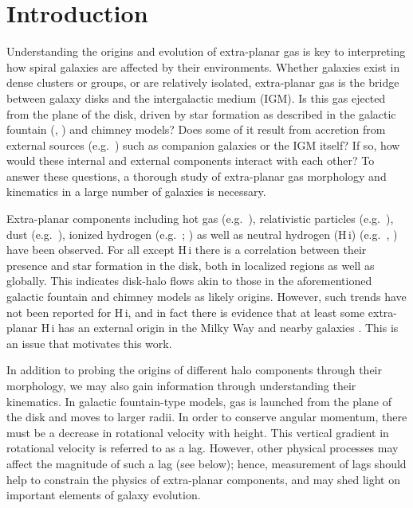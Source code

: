 \documentclass{emulateapj}
\begin{document}

\section{Introduction} \label{Section1}


\par
     Understanding the origins and evolution of extra-planar gas is key to interpreting how spiral galaxies are affected by their environments.  Whether galaxies exist in dense clusters or groups, or are relatively isolated, extra-planar gas is the bridge between galaxy disks and the intergalactic medium (IGM).  Is this gas ejected from the plane of the disk, driven by star formation as described in the galactic fountain (\citealt{1976ApJ...205..762S}, \citealt{1980ApJ...236..577B}) and chimney \citep{1989ApJ...345..372N} models?  Does some of it result from accretion from external sources (e.g.\ \citealt{2009ApJ...700L...1K}) such as companion galaxies or the IGM itself?  If so, how would these internal and external components interact with each other?  To answer these questions, a thorough study of extra-planar gas morphology and kinematics in a large number of galaxies is necessary.

\par
     Extra-planar components including hot gas (e.g.\ \citealt{2006A&A...448...43T}), relativistic particles (e.g.\ \citealt{1999AJ....117.2102I}), dust (e.g.\ \citealt{1999AJ....117.2077H}), ionized hydrogen (e.g.\ \citealt{1996ApJ...462..712R}; \citealt{2003A&A...406..493R}) as well as neutral hydrogen ({\sc H\,i}) (e.g.\ \citealt{1997ApJ...491..140S}, \citealt{2007AJ....134.1019O}) have been observed.   For all except {\sc H\,i} there is a correlation between their presence and star formation in the disk, both in localized regions as well as globally.  This indicates disk-halo flows akin to those in the aforementioned galactic fountain and chimney models as likely origins.  However, such trends have not been reported for {\sc H\,i}, and in fact there is evidence that at least some extra-planar {\sc H\,i} has an external origin in the Milky Way \citep{1997ARA&A..35..217W} and nearby galaxies \citep{2008A&ARv..15..189S}.  This is an issue that motivates this work.

\par
     In addition to probing the origins of different halo components through their morphology, we may also gain information through understanding their kinematics.  In galactic fountain-type models, gas is launched from the plane of the disk and moves to larger radii.  In order to conserve angular momentum, there must be a decrease in rotational velocity with height.  This vertical gradient in rotational velocity is referred to as a lag.  However, other physical processes may affect the magnitude of such a lag (see below); hence, measurement of lags should help to constrain the physics of extra-planar components, and may shed light on important elements of galaxy evolution.  
\end{document}

